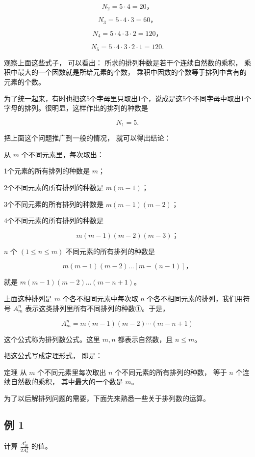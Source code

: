 \[
N _ {2} = 5 \cdot 4 = 20\text{，}
\]

\[
N _ {3} = 5 \cdot 4 \cdot 3 = 60\text{，}
\]

\[
N _ {4} = 5 \cdot 4 \cdot 3 \cdot 2 = 120\text{，}
\]

\[
N _ {5} = 5 \cdot 4 \cdot 3 \cdot 2 \cdot 1 = 120.
\]

观察上面这些式子， 可以看出： 所求的排列种数是若干个连续自然数的乘积，
乘积中最大的一个因数就是所给元素的个数，
乘积中因数的个数等于排列中含有的元素的个数。

为了统一起来，有时也把这5个字母里只取出1个，说成是这5个不同字母中取出1个字母的排列。很明显，这样作出的排列的种数是

\[
N _ {1} = 5.
\]

把上面这个问题推广到一般的情况， 就可以得出结论：

从 \(m\) 个不同元素里，每次取出：

1个元素的所有排列的种数是 \(m\)；

2个不同元素的所有排列的种数是 \(m(m - 1)\)；

3个不同元素的所有排列的种数是 \(m(m - 1)(m - 2)\)；

4个不同元素的所有排列的种数是

\[
m (m - 1) (m - 2) (m - 3)\text{；}
\]

\(n\) 个 \((1 \leqslant n \leqslant m)\) 不同元素的所有排列的种数是

\[
m (m - 1) (m - 2) \dots [ m - (n - 1) ]\text{，}
\]

就是 \(m(m-1)(m-2)\dots(m-n+1)\)。

上面这种排列是 \(m\) 个各不相同元素中每次取 \(n\)
个各不相同元素的排列，我们用符号 \(A_m^n\)
表示这类排列里所有不同排列的种数①。于是，

\[
\boxed{A_m^n=m(m-1)(m-2)\cdots(m-n+1)}
\]

这个公式称为排列数公式。这里 \(m, n\) 都表示自然数，且
\(n \leqslant m\)。

把这公式写成定理形式， 即是：

定理 从 \(m\) 个不同元素里每次取出 \(n\) 个不同元素的所有排列的种数，
等于 \(n\) 个连续自然数的乘积， 其中最大的一个数是 \(m\)。

为了以后解排列问题的需要，下面先来熟悉一些关于排列数的运算。

\subsection{例 1}

计算 \(\frac{A_{16}^{3}}{2A_{8}^{4}}\) 的值。

